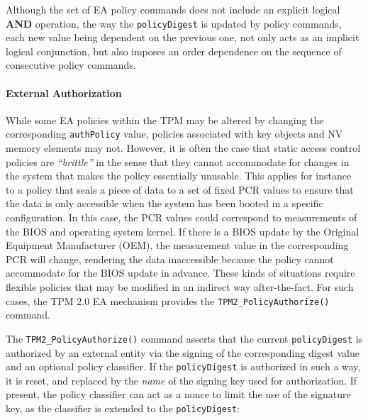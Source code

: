 \documentclass{sig-alternate-2013}
\begin{document}
\vspace{.5\baselineskip}
\noindent
{}

\vspace{.5\baselineskip}

Although the set of EA policy commands does not include an explicit logical
\textbf{AND} operation, the way the \texttt{policyDigest} is updated by policy
commands, each new value being dependent on the previous one, not only acts as
an implicit logical conjunction, but also imposes an order dependence on the
sequence of consecutive policy commands.

\paragraph{External Authorization}
\label{sec:external-authorization}

While some EA policies within the TPM may be altered by changing the
corresponding \texttt{authPolicy} value, policies associated with key objects
and NV memory elements may not. However, it is often the case that static access
control policies are \emph{``brittle''} in the sense that they cannot
accommodate for changes in the system that makes the policy essentially
unusable. This applies for instance to a policy that seals a piece of data to a
set of fixed PCR values to ensure that the data is only accessible when the
system has been booted in a specific configuration. In this case, the PCR values
could correspond to measurements of the BIOS and operating system kernel. If
there is a BIOS update by the Original Equipment Manufacturer (OEM), the
measurement value in the corresponding PCR will change, rendering the data
inaccessible because the policy cannot accommodate for the BIOS update in
advance. These kinds of situations require flexible policies that may be
modified in an indirect way after-the-fact. For such cases, the TPM 2.0 EA
mechanism provides the \texttt{TPM2\_PolicyAuthorize()} command.

The \texttt{TPM2\_PolicyAuthorize()} command asserts that the current
\texttt{policyDigest} is authorized by an external entity via the signing of the
corresponding digest value and an optional policy classifier\footnotemark. If
the \texttt{policyDigest} is authorized in such a way, it is reset, and replaced
by the \emph{name} of the signing key used for authorization. If present, the
policy classifier can act as a nonce to limit the use of the signature key, as the
classifier is extended to the \texttt{policyDigest}:
\end{document}
